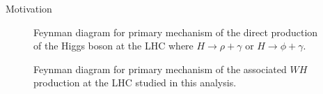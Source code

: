 \begin{section}{Motivation}
\begin{figure}[htb]
\begin{center}
\subfloat      {
\scalebox{.45}[0.45]{}
}\quad
\subfloat      {
\scalebox{.45}[0.45]{}
}
\end{center}
\caption{Feynman diagram\cite{cite-tikz-feynman} for primary mechanism of the direct production of the Higgs boson at the LHC where $H \rightarrow \rho+\gamma$ or $H \rightarrow \phi+\gamma$.}
\label{fig:direct-prod}
\end{figure}

\begin{figure}[htb]
\begin{center}
\subfloat      {
\scalebox{.55}[0.55]{}
}\quad
\subfloat      {
\scalebox{.55}[0.55]{}
}
\end{center}
\caption{Feynman diagram\cite{cite-tikz-feynman} for primary mechanism of the associated $WH$ production at the LHC studied in this analysis.}
\label{fig:whiggs-prod}
\end{figure}

\end{section}

